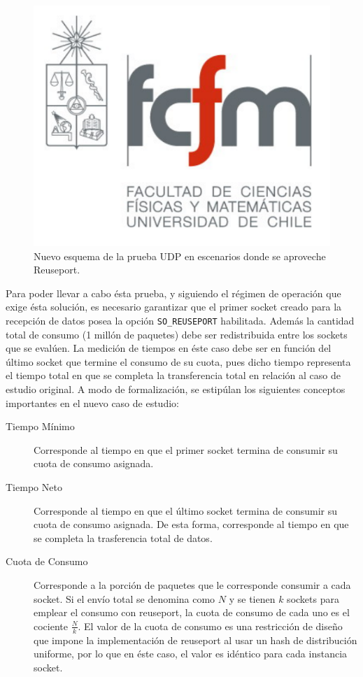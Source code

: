 \begin{figure}[!h]
	\centering
	\includegraphics[scale=.3]{imagenes/fcfm}
	\caption{Nuevo esquema de la prueba UDP en escenarios donde se aproveche Reuseport.}
	\label{fig:casoPruebaReuseport}
\end{figure}

Para poder llevar a cabo ésta prueba, y siguiendo el régimen de operación que exige ésta solución, es necesario garantizar que el primer socket creado para la recepción de datos posea la opción \verb=SO_REUSEPORT= habilitada. Además la cantidad total de consumo (1 millón de paquetes) debe ser redistribuida entre los sockets que se evalúen. La medición de tiempos en éste caso debe ser en función del último socket que termine el consumo de su cuota, pues dicho tiempo representa el tiempo total en que se completa la transferencia total en relación al caso de estudio original. A modo de formalización, se estipúlan los siguientes conceptos importantes en el nuevo caso de estudio:
\begin{description}
\item[Tiempo Mínimo] Corresponde al tiempo en que el primer socket termina de consumir su cuota de consumo asignada.
\item[Tiempo Neto] Corresponde al tiempo en que el último socket termina de consumir su cuota de consumo asignada. De esta forma, corresponde al tiempo en que se completa la trasferencia total de datos.
\item[Cuota de Consumo] Corresponde a la porción de paquetes que le corresponde consumir a cada socket. Si el envío total se denomina como $N$ y se tienen $k$ sockets para emplear el consumo con reuseport, la cuota de consumo de cada uno es el cociente $\frac{N}{k}$. El valor de la cuota de consumo es una restricción de diseño que impone la implementación de reuseport al usar un hash de distribución uniforme, por lo que en éste caso, el valor es idéntico para cada instancia socket.
\end{description}


